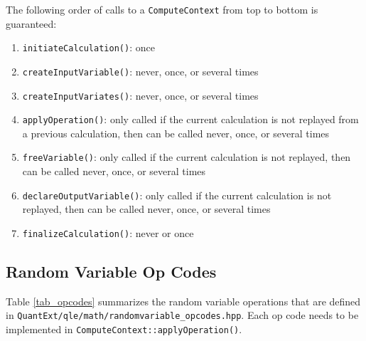 \documentclass[12pt, a4paper]{article}
\begin{document}
The following order of calls to a \verb+ComputeContext+ from top to bottom is guaranteed:

\begin{enumerate}
\item \verb+initiateCalculation()+: once
\item \verb+createInputVariable()+: never, once, or several times
\item \verb+createInputVariates()+: never, once, or several times
\item \verb+applyOperation()+: only called if the current calculation is not replayed from a previous calculation, then can be called never, once, or several times
\item \verb+freeVariable()+: only called if the current calculation is not replayed, then can be called never, once, or several times
\item \verb+declareOutputVariable()+: only called if the current calculation is not replayed, then can be called never, once, or several times
\item \verb+finalizeCalculation()+: never or once
\end{enumerate}

\subsection{Random Variable Op Codes}\label{randomVariableOpCodes}

Table \ref{tab_opcodes} summarizes the random variable operations that are defined in
\verb+QuantExt/qle/math/randomvariable_opcodes.hpp+. Each op code needs to be implemented in
\verb+ComputeContext::applyOperation()+.
\end{document}
